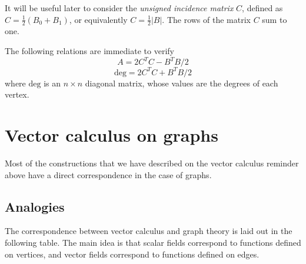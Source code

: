 It will be useful later to consider the \emph{unsigned incidence matrix}
$C$, defined as $C=\frac{1}{2}(B_0 + B_1)$, or equivalently
$C=\frac{1}{2}|B|$.  The rows of the matrix $C$ sum to one.



The following relations are immediate to verify
\[
A = 2C^TC-B^TB/2
\]
\[
\mathrm{deg} = 2C^TC+B^TB/2
\]
where $\mathrm{deg}$ is an $n\times n$ diagonal matrix, whose values are the
degrees of each vertex.



\section{Vector calculus on graphs}


Most of the constructions that we have described on the vector calculus
reminder above have a direct correspondence in the case of graphs.


\subsection{Analogies}


The correspondence between vector calculus and graph theory is laid out in
the following table.
The main idea is that scalar fields correspond to
functions defined on vertices, and vector fields correspond to functions
defined on edges.


